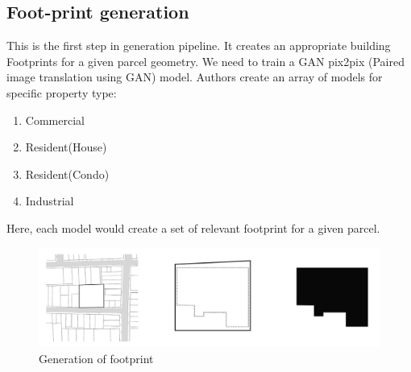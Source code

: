                 \subsection{Foot-print generation}
                        This is the first step in generation pipeline. It creates an appropriate building Footprints for a given parcel geometry. We need to train a GAN pix2pix (Paired image translation using GAN) model. Authors \cite{chaillou_2019} create an array of models for specific property type: 
                        \begin{enumerate}[label=\alph*.]
                                \item Commercial 
                                \item Resident(House)
                                \item Resident(Condo)
                                \item Industrial
                        \end{enumerate}
                        Here, each model would create a set of relevant footprint for a given parcel. 
                        \begin{figure}[h]
                                \centering
                                \includegraphics[width=1\textwidth]{img/chapter_6/footprint.png}
                                \caption{Generation of footprint}
                                \label{fig: Generation of footprint}
                        \end{figure}
